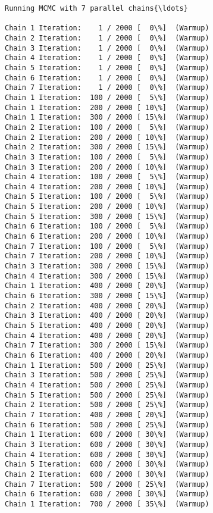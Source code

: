 \documentclass[11pt]{article}
\begin{document}
    \begin{Verbatim}[commandchars=\\\{\}]
Running MCMC with 7 parallel chains{\ldots}

Chain 1 Iteration:    1 / 2000 [  0\%]  (Warmup)
Chain 2 Iteration:    1 / 2000 [  0\%]  (Warmup)
Chain 3 Iteration:    1 / 2000 [  0\%]  (Warmup)
Chain 4 Iteration:    1 / 2000 [  0\%]  (Warmup)
Chain 5 Iteration:    1 / 2000 [  0\%]  (Warmup)
Chain 6 Iteration:    1 / 2000 [  0\%]  (Warmup)
Chain 7 Iteration:    1 / 2000 [  0\%]  (Warmup)
Chain 1 Iteration:  100 / 2000 [  5\%]  (Warmup)
Chain 1 Iteration:  200 / 2000 [ 10\%]  (Warmup)
Chain 1 Iteration:  300 / 2000 [ 15\%]  (Warmup)
Chain 2 Iteration:  100 / 2000 [  5\%]  (Warmup)
Chain 2 Iteration:  200 / 2000 [ 10\%]  (Warmup)
Chain 2 Iteration:  300 / 2000 [ 15\%]  (Warmup)
Chain 3 Iteration:  100 / 2000 [  5\%]  (Warmup)
Chain 3 Iteration:  200 / 2000 [ 10\%]  (Warmup)
Chain 4 Iteration:  100 / 2000 [  5\%]  (Warmup)
Chain 4 Iteration:  200 / 2000 [ 10\%]  (Warmup)
Chain 5 Iteration:  100 / 2000 [  5\%]  (Warmup)
Chain 5 Iteration:  200 / 2000 [ 10\%]  (Warmup)
Chain 5 Iteration:  300 / 2000 [ 15\%]  (Warmup)
Chain 6 Iteration:  100 / 2000 [  5\%]  (Warmup)
Chain 6 Iteration:  200 / 2000 [ 10\%]  (Warmup)
Chain 7 Iteration:  100 / 2000 [  5\%]  (Warmup)
Chain 7 Iteration:  200 / 2000 [ 10\%]  (Warmup)
Chain 3 Iteration:  300 / 2000 [ 15\%]  (Warmup)
Chain 4 Iteration:  300 / 2000 [ 15\%]  (Warmup)
Chain 1 Iteration:  400 / 2000 [ 20\%]  (Warmup)
Chain 6 Iteration:  300 / 2000 [ 15\%]  (Warmup)
Chain 2 Iteration:  400 / 2000 [ 20\%]  (Warmup)
Chain 3 Iteration:  400 / 2000 [ 20\%]  (Warmup)
Chain 5 Iteration:  400 / 2000 [ 20\%]  (Warmup)
Chain 4 Iteration:  400 / 2000 [ 20\%]  (Warmup)
Chain 7 Iteration:  300 / 2000 [ 15\%]  (Warmup)
Chain 6 Iteration:  400 / 2000 [ 20\%]  (Warmup)
Chain 1 Iteration:  500 / 2000 [ 25\%]  (Warmup)
Chain 3 Iteration:  500 / 2000 [ 25\%]  (Warmup)
Chain 4 Iteration:  500 / 2000 [ 25\%]  (Warmup)
Chain 5 Iteration:  500 / 2000 [ 25\%]  (Warmup)
Chain 2 Iteration:  500 / 2000 [ 25\%]  (Warmup)
Chain 7 Iteration:  400 / 2000 [ 20\%]  (Warmup)
Chain 6 Iteration:  500 / 2000 [ 25\%]  (Warmup)
Chain 1 Iteration:  600 / 2000 [ 30\%]  (Warmup)
Chain 3 Iteration:  600 / 2000 [ 30\%]  (Warmup)
Chain 4 Iteration:  600 / 2000 [ 30\%]  (Warmup)
Chain 5 Iteration:  600 / 2000 [ 30\%]  (Warmup)
Chain 2 Iteration:  600 / 2000 [ 30\%]  (Warmup)
Chain 7 Iteration:  500 / 2000 [ 25\%]  (Warmup)
Chain 6 Iteration:  600 / 2000 [ 30\%]  (Warmup)
Chain 1 Iteration:  700 / 2000 [ 35\%]  (Warmup)

\end{Verbatim}
\end{document}
